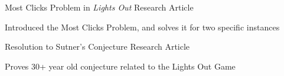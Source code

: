 \documentclass[a4paper]{awesome-cv}
\begin{document}
	\begin{cventries}
		\cvprojectentry
		{Most Clicks Problem in \textit{Lights Out}} %
		{Research Article} %
		{
			\begin{cvitems} %
				\item {Introduced the Most Clicks Problem, and solves it for two specific instances}
			\end{cvitems}
		}
	
		\cvprojectentry
		{Resolution to Sutner's Conjecture} %
		{Research Article} %
		{
			\begin{cvitems} %
				\item {Proves 30+ year old conjecture related to the Lights Out Game}
			\end{cvitems}
		}
	\end{cventries}
	
	
\end{document}
